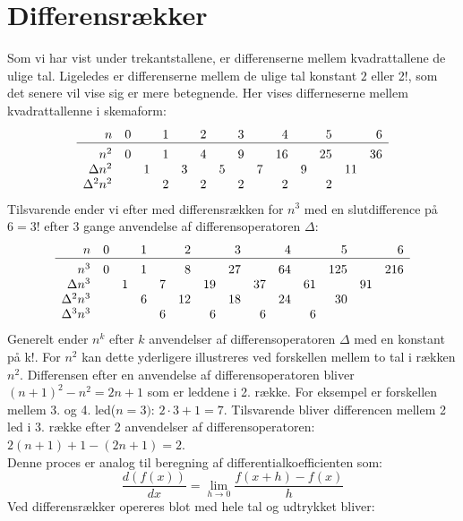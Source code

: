 \section{Differensrækker}
Som vi har vist under trekantstallene, er differenserne mellem kvadrattallene de ulige tal. Ligeledes er differenserne mellem de ulige tal konstant \(2\) eller 2!, som det senere vil vise sig er mere betegnende. Her vises differneserne mellem kvadrattallenne i skemaform:
\begin{equation*}
\begin{array}{rrrrrrrrrrrrrr}
n&0&&1&&2&&3&&4&&5&&6\\
\hline \\[-3mm]
n^{2}&0&&1&&4&&9&&16&&25&&36\\
\Delta n^{2}&&1&&3&&5&&7&&9&&11&\\
\Delta^{2}n^{2}&&&2&&2&&2&&2&&2&&\\
\end{array}
\end{equation*}
Tilsvarende ender vi efter med differensrækken for \(n^{3}\) med en slutdifference på \(6=3!\) efter 3 gange anvendelse af differensoperatoren \(\Delta\):
\begin{equation*}
\begin{array}{rrrrrrrrrrrrrr}
n&0&&1&&2&&3&&4&&5&&6\\
\hline \\[-3mm]
n^{3}&0&&1&&8&&27&&64&&125&&216\\
\Delta n^{3}&&1&&7&&19&&37&&61&&91&\\
\Delta^{2}n^{3}&&&6&&12&&18&&24&&30&&\\
\Delta^{3} n^{3}&&&&6&&6&&6&&6&&&\\
\end{array}
\end{equation*}
Generelt ender \(n^{k}\) efter \(k\) anvendelser af differensoperatoren \(\Delta\) med en konstant på k!. For \(n^{2}\) kan dette yderligere illustreres ved forskellen mellem to tal i rækken \(n^{2}\). Differensen efter en anvendelse af differensoperatoren bliver \((n+1)^{2}-n^{2}=2n+1\) som er leddene i 2. række. For eksempel er forskellen mellem 3. og 4. led(\(n=3)\): \(2 \cdot 3+1=7\). Tilsvarende bliver differencen mellem 2 led i 3. række efter 2 anvendelser af differensoperatoren: \(2(n+1)+1-(2n+1)=2\).\\
Denne proces er analog til beregning af differentialkoefficienten som:
\[\frac{d(f(x))}{dx}=\lim_{h \to 0}\frac{f(x+h)-f(x)}{h}\]
Ved differensrækker opereres blot med hele tal og udtrykket bliver:
